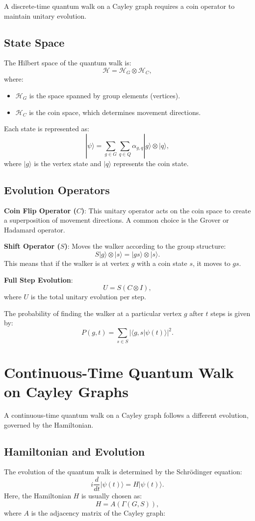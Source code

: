 \documentclass[11pt]{article}
\theoremstyle{definition}
\begin{document}
A discrete-time quantum walk on a Cayley graph requires a coin operator to maintain unitary evolution.

\subsection*{State Space}
The Hilbert space of the quantum walk is:
\[
\mathcal{H} = \mathcal{H}_G \otimes \mathcal{H}_C,
\]
where:
\begin{itemize}
    \item \( \mathcal{H}_G \) is the space spanned by group elements (vertices).
    \item \( \mathcal{H}_C \) is the coin space, which determines movement directions.
\end{itemize}

Each state is represented as:
\[
|\psi\rangle = \sum_{g \in G} \sum_{q \in Q} \alpha_{g,q} |g\rangle \otimes |q\rangle,
\]
where \( |g\rangle \) is the vertex state and \( |q\rangle \) represents the coin state.

\subsection*{Evolution Operators}
\textbf{Coin Flip Operator (\( C \))}: This unitary operator acts on the coin space to create a superposition of movement directions. A common choice is the Grover or Hadamard operator.

\textbf{Shift Operator (\( S \))}: Moves the walker according to the group structure:
\[
S |g\rangle \otimes |s\rangle = |gs\rangle \otimes |s\rangle.
\]
This means that if the walker is at vertex \( g \) with a coin state \( s \), it moves to \( gs \).

\textbf{Full Step Evolution}:
\[
U = S (C \otimes I),
\]
where \( U \) is the total unitary evolution per step.

The probability of finding the walker at a particular vertex \( g \) after \( t \) steps is given by:
\[
P(g, t) = \sum_{s \in S} |\langle g, s | \psi(t) \rangle |^2.
\]


\section*{Continuous-Time Quantum Walk on Cayley Graphs}

A continuous-time quantum walk on a Cayley graph follows a different evolution, governed by the Hamiltonian.

\subsection*{Hamiltonian and Evolution}
The evolution of the quantum walk is determined by the Schrödinger equation:
\[
i \frac{d}{dt} |\psi(t)\rangle = H |\psi(t)\rangle.
\]
Here, the Hamiltonian \( H \) is usually chosen as:
\[
H = A(\Gamma(G,S)),
\]
where \( A \) is the adjacency matrix of the Cayley graph:
\end{document}
